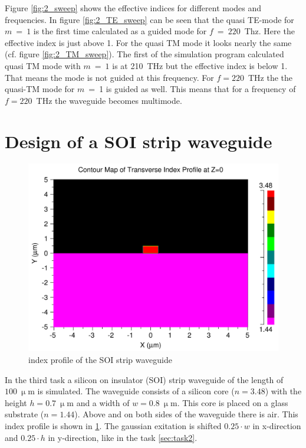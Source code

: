Figure \ref{fig:2_sweep} shows the effective indices for different modes and frequencies. In figure \ref{fig:2_TE_sweep} can be seen that the quasi TE-mode for $m~=~1$ is the first time calculated as a guided mode for $f~=~220$~Thz.  Here the effective index is just above 1. For the quasi TM mode it looks nearly the same (cf. figure \ref{fig:2_TM_sweep}). The first of the simulation program calculated quasi TM mode with $m~=~1$ is at 210~THz but the effective index is below 1. That means the mode is not guided at this frequency. For $f = 220$~THz the the quasi-TM mode for $m$~=~1 is guided as well.
This means that for a frequency of $f = 220$~THz the waveguide becomes multimode.



\section{Design of a SOI strip waveguide}

\begin{figure}[h]%
\centering
\includegraphics[totalheight=5.5 cm]{Grafiken/3_index.pdf}%
\caption{index profile of the SOI strip waveguide}%
\label{fig:index_profile_3}%
\end{figure}
In the third task a silicon on insulator (SOI) strip waveguide of the length of $100~\upmu$m is simulated. The waveguide consists of a silicon core ($n=3.48$) with the height $h=0.7~\upmu$m and a width of $w=0.8~\upmu$m. This core is placed on a glass substrate ($n=1.44$). Above and on both sides of the waveguide there is air. This index profile is shown in \ref{fig:index_profile_3}. The gaussian exitation is shifted $0.25\cdot w$ in x-direction and $0.25\cdot h$ in y-direction, like in the task \ref{sec:task2}.


